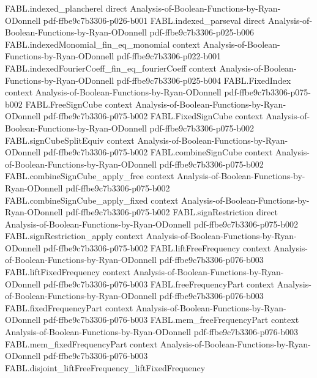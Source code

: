 \begin{theorem}
\proofstep
  {FABL.indexed_plancherel}
  {direct}
  {Analysis-of-Boolean-Functions-by-Ryan-ODonnell}
  {pdf-ffbe9c7b3306-p026-b001}
\proofstep
  {FABL.indexed_parseval}
  {direct}
  {Analysis-of-Boolean-Functions-by-Ryan-ODonnell}
  {pdf-ffbe9c7b3306-p025-b006}
\proofstep
  {FABL.indexedMonomial_fin_eq_monomial}
  {context}
  {Analysis-of-Boolean-Functions-by-Ryan-ODonnell}
  {pdf-ffbe9c7b3306-p022-b001}
\proofstep
  {FABL.indexedFourierCoeff_fin_eq_fourierCoeff}
  {context}
  {Analysis-of-Boolean-Functions-by-Ryan-ODonnell}
  {pdf-ffbe9c7b3306-p025-b004}
\proofstep
  {FABL.FixedIndex}
  {context}
  {Analysis-of-Boolean-Functions-by-Ryan-ODonnell}
  {pdf-ffbe9c7b3306-p075-b002}
\proofstep
  {FABL.FreeSignCube}
  {context}
  {Analysis-of-Boolean-Functions-by-Ryan-ODonnell}
  {pdf-ffbe9c7b3306-p075-b002}
\proofstep
  {FABL.FixedSignCube}
  {context}
  {Analysis-of-Boolean-Functions-by-Ryan-ODonnell}
  {pdf-ffbe9c7b3306-p075-b002}
\proofstep
  {FABL.signCubeSplitEquiv}
  {context}
  {Analysis-of-Boolean-Functions-by-Ryan-ODonnell}
  {pdf-ffbe9c7b3306-p075-b002}
\proofstep
  {FABL.combineSignCube}
  {context}
  {Analysis-of-Boolean-Functions-by-Ryan-ODonnell}
  {pdf-ffbe9c7b3306-p075-b002}
\proofstep
  {FABL.combineSignCube_apply_free}
  {context}
  {Analysis-of-Boolean-Functions-by-Ryan-ODonnell}
  {pdf-ffbe9c7b3306-p075-b002}
\proofstep
  {FABL.combineSignCube_apply_fixed}
  {context}
  {Analysis-of-Boolean-Functions-by-Ryan-ODonnell}
  {pdf-ffbe9c7b3306-p075-b002}
\proofstep
  {FABL.signRestriction}
  {direct}
  {Analysis-of-Boolean-Functions-by-Ryan-ODonnell}
  {pdf-ffbe9c7b3306-p075-b002}
\proofstep
  {FABL.signRestriction_apply}
  {context}
  {Analysis-of-Boolean-Functions-by-Ryan-ODonnell}
  {pdf-ffbe9c7b3306-p075-b002}
\proofstep
  {FABL.liftFreeFrequency}
  {context}
  {Analysis-of-Boolean-Functions-by-Ryan-ODonnell}
  {pdf-ffbe9c7b3306-p076-b003}
\proofstep
  {FABL.liftFixedFrequency}
  {context}
  {Analysis-of-Boolean-Functions-by-Ryan-ODonnell}
  {pdf-ffbe9c7b3306-p076-b003}
\proofstep
  {FABL.freeFrequencyPart}
  {context}
  {Analysis-of-Boolean-Functions-by-Ryan-ODonnell}
  {pdf-ffbe9c7b3306-p076-b003}
\proofstep
  {FABL.fixedFrequencyPart}
  {context}
  {Analysis-of-Boolean-Functions-by-Ryan-ODonnell}
  {pdf-ffbe9c7b3306-p076-b003}
\proofstep
  {FABL.mem_freeFrequencyPart}
  {context}
  {Analysis-of-Boolean-Functions-by-Ryan-ODonnell}
  {pdf-ffbe9c7b3306-p076-b003}
\proofstep
  {FABL.mem_fixedFrequencyPart}
  {context}
  {Analysis-of-Boolean-Functions-by-Ryan-ODonnell}
  {pdf-ffbe9c7b3306-p076-b003}
\proofstep
  {FABL.disjoint_liftFreeFrequency_liftFixedFrequency}

\end{theorem}
